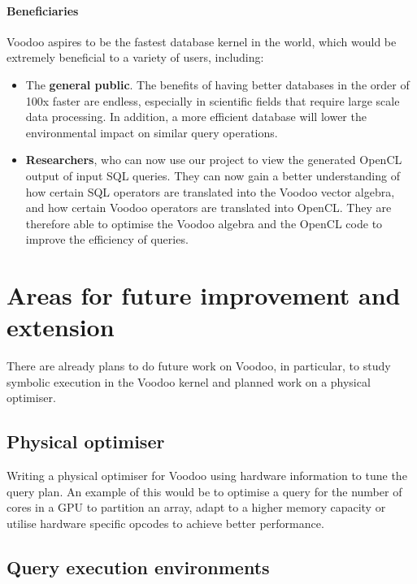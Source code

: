 \paragraph{Beneficiaries}

Voodoo aspires to be the fastest database kernel in the world, which would be extremely beneficial to a variety of users, including:

\begin{itemize}
    \item The \textbf{general public}. The benefits of having better databases in the order of 100x faster are endless, especially in scientific fields that require large scale data processing. In addition, a more efficient database will lower the environmental impact on similar query operations.
    
    \item \textbf{Researchers}, who can now use our project to view the generated OpenCL output of input SQL queries. They can now gain a better understanding of how certain SQL operators are translated into the Voodoo vector algebra, and how certain Voodoo operators are translated into OpenCL. They are therefore able to optimise the Voodoo algebra and the OpenCL code to improve the efficiency of queries.
\end{itemize}

\section{Areas for future improvement and extension}\label{sec:extensions}

There are already plans to do future work on Voodoo, in particular, to study symbolic execution in the Voodoo kernel and planned work on a physical optimiser.

\subsection{Physical optimiser}

Writing a physical optimiser for Voodoo using hardware information to tune the query plan. An example of this would be to optimise a query for the number of cores in a GPU to partition an array, adapt to a higher memory capacity or utilise hardware specific opcodes to achieve better performance.

\subsection{Query execution environments}

